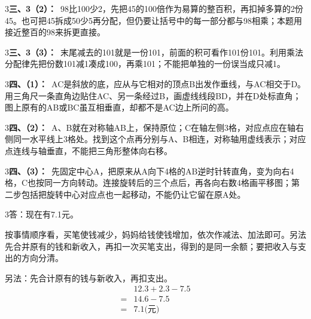 \documentclass[multi=snippet,border={5bp 20bp 5bp 5bp}]{standalone}
\newenvironment{snippet}[3]{\begin{minipage}{#1bp}\color{answerred}\fontsize{#2}{#3}\selectfont\raggedright}{\end{minipage}}
\begin{document}
\begin{snippet}{505}{11.5}{14}\begin{multicols}{3}\raggedcolumns \textbf{三、3（2）：}\ 98比100少2，先把45的100倍作为易算的整百积，再扣掉多算的2份45。也可把45拆成50少5再分配，但仍要让括号中的每一部分都与98相乘；本题用接近整百的98来拆更直接。\end{multicols}\end{snippet}
\begin{snippet}{505}{11.5}{14}\begin{multicols}{3}\raggedcolumns \textbf{三、3（3）：}\ 末尾减去的101就是一份101，前面的积可看作101份101。利用乘法分配律先把份数101减1凑成100，再乘101；不能把单独的一份误当成只减1。\end{multicols}\end{snippet}
\begin{snippet}{505}{11.5}{14}\begin{multicols}{3}\raggedcolumns \textbf{四、（1）：}\ AC是斜放的底，应从与它相对的顶点B出发作垂线，与AC相交于D。用三角尺一条直角边贴住AC、另一条经过B，画虚线线段BD，并在D处标直角；图上原有的AB或BC虽互相垂直，却都不是AC边上所问的高。\end{multicols}\end{snippet}
\begin{snippet}{505}{11.5}{14}\begin{multicols}{3}\raggedcolumns \textbf{四、（2）：}\ A、B就在对称轴AB上，保持原位；C在轴左侧3格，对应点应在轴右侧同一水平线上3格处。找到这个点再分别与A、B相连，对称轴用虚线表示；对应点连线与轴垂直，不能把三角形整体向右移。\end{multicols}\end{snippet}
\begin{snippet}{505}{11.5}{14}\begin{multicols}{3}\raggedcolumns \textbf{四、（3）：}\ 先固定中心A，把原来从A向下4格的AB逆时针转直角，变为向右4格，C也按同一方向转动。连接旋转后的三个点后，再各向右数4格画平移图；第二步包括把旋转中心对应点也一起移动，不能仍让它留在原A处。\end{multicols}\end{snippet}
\begin{snippet}{505}{11.5}{14}\begin{multicols}{3}\raggedcolumns 答：现在有7.1元。\par 按事情顺序看，买笔使钱减少，妈妈给钱使钱增加，依次作减法、加法即可。另法先合并原有的钱和新收入，再扣一次买笔支出，得到的是同一余额；要把收入与支出的方向分清。\par 另法：先合计原有的钱与新收入，再扣支出。\[\begin{aligned} &12.3+2.3-7.5\\={}&14.6-7.5\\={}&7.1\text{(元)}\end{aligned}\]\end{multicols}\end{snippet}
\end{document}
